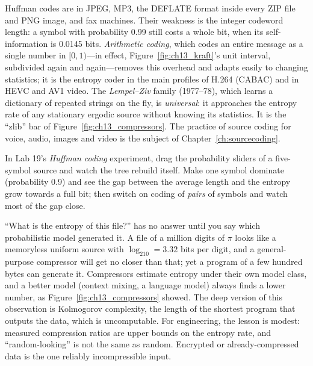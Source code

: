 \begin{inpractice}
Huffman codes are in JPEG, MP3, the DEFLATE format inside every ZIP file and PNG image, and fax
machines. Their weakness is the integer codeword length: a symbol with probability 0.99 still
costs a whole bit, when its self-information is 0.0145 bits. \emph{Arithmetic coding}, which
codes an entire message as a single number in $[0,1)$---in effect, Figure~\ref{fig:ch13_kraft}'s
unit interval, subdivided again and again---removes this overhead and adapts easily to changing
statistics; it is the entropy coder in the main profiles of H.264 (CABAC) and in HEVC and AV1
video. The \emph{Lempel--Ziv} family (1977--78), which learns a dictionary of repeated strings on
the fly, is \emph{universal}: it approaches the entropy rate of any stationary ergodic source
without knowing its statistics. It is the ``zlib'' bar of Figure~\ref{fig:ch13_compressors}. The
practice of source coding for voice, audio, images and video is the subject of
Chapter~\ref{ch:sourcecoding}.
\end{inpractice}

\begin{tryit}
In Lab 19's \emph{Huffman coding} experiment, drag the probability sliders of a five-symbol source
and watch the tree rebuild itself. Make one symbol dominate (probability 0.9) and see the gap
between the average length and the entropy grow towards a full bit; then switch on coding of
\emph{pairs} of symbols and watch most of the gap close.
\end{tryit}

\begin{pitfall}
``What is the entropy of this file?'' has no answer until you say which probabilistic model
generated it. A file of a million digits of $\pi$ looks like a memoryless uniform source with
$\log_210=3.32$ bits per digit, and a general-purpose compressor will get no closer than that; yet
a program of a few hundred bytes can generate it. Compressors estimate entropy under their own
model class, and a better model (context mixing, a language model) always finds a lower number,
as Figure~\ref{fig:ch13_compressors} showed. The deep version of this observation is Kolmogorov
complexity, the length of the shortest program that outputs the data, which is uncomputable. For
engineering, the lesson is modest: measured compression ratios are upper bounds on the entropy
rate, and ``random-looking'' is not the same as random. Encrypted or already-compressed data is
the one reliably incompressible input.
\end{pitfall}

